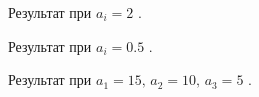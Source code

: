 \documentclass[a5paper, 10pt]{article}
\theoremstyle{definition}
\theoremstyle{plain}
\theoremstyle{remark}
\begin{document}
\begin{figure}[h!]
\caption{Результат при $a_i = 2$ .}
\end{figure}

\newpage
\begin{figure}[h!]
\caption{Результат при $a_i = 0.5$ .}
\end{figure}

\newpage
\begin{figure}[h!]
\caption{Результат при $a_1 = 15, \, a_2 = 10, \, a_3 = 5$ .}
\end{figure}
\end{document}
